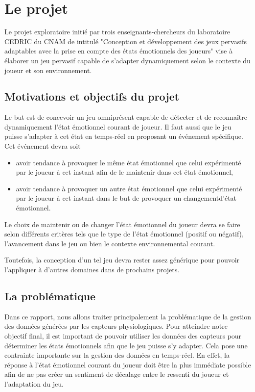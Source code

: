 \documentclass{article}
\begin{document}
\section{Le projet}
	Le projet exploratoire initié par trois enseignants-chercheurs du laboratoire CEDRIC du CNAM de intitulé "Conception et développement des jeux pervasifs adaptables avec la prise en compte des états émotionnels des joueurs" vise à élaborer un jeu pervasif capable de s'adapter dynamiquement selon le contexte du joueur et son environnement.
	\subsection{Motivations et objectifs du projet}
		Le but est de concevoir un jeu omniprésent capable de détecter et de reconnaître dynamiquement l'état émotionnel courant de joueur. 
		Il faut aussi que le jeu puisse s'adapter à cet état en temps-réel en proposant un événement spécifique. 
		Cet événement devra soit 
		\begin{itemize}
			\item avoir tendance à provoquer le même état émotionnel que celui expérimenté par le joueur à cet instant afin de le maintenir dans cet état émotionnel,
			\item avoir tendance à provoquer un autre état émotionnel que celui expérimenté par le joueur à cet instant dans le but de provoquer un changementd'état émotionnel.
		\end{itemize}
		Le choix de maintenir ou de changer l'état émotionnel du joueur devra se faire selon différents critères tels que le type de l'état émotionnel (positif ou négatif), l'avancement dans le jeu ou bien le contexte environnemental courant.\par
		Toutefois, la conception d'un tel jeu devra rester assez générique pour pouvoir l'appliquer à d'autres domaines dans de prochains projets.
	\subsection{La problématique}
		Dans ce rapport, nous allons traiter principalement la problématique de la gestion des données générées par les capteurs physiologiques.
		Pour atteindre notre objectif final, il est important de pouvoir utiliser les données des capteurs pour déterminer les états émotionnels afin que le jeu puisse s'y adapter. Cela pose une contrainte importante sur la gestion des données en temps-réel.
		En effet, la réponse à l'état émotionnel courant du joueur doit être la plus immédiate possible afin de ne pas créer un sentiment de décalage entre le ressenti du joueur et l'adaptation du jeu.
\end{document}
